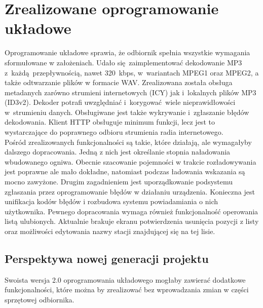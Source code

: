 \documentclass[polish]{aghengthesis}
\begin{document}
	\section{Zrealizowane oprogramowanie układowe}
			Oprogramowanie układowe sprawia, że odbiornik spełnia wszystkie wymagania sformułowane w założeniach.
			Udało się zaimplementować dekodowanie MP3 z~każdą przepływnością, nawet 320~kbps, w~wariantach MPEG1 oraz MPEG2, a także odtwarzanie plików w formacie WAV.
			Zrealizowana została obsługa metadanych zarówno strumieni internetowych (ICY) jak i~lokalnych plików MP3 (ID3v2). Dekoder potrafi uwzględniać i~korygować wiele nieprawidłowości w~strumieniu danych. Obsługiwane jest także wykrywanie i~zgłaszanie błędów dekodowania. Klient HTTP obsługuje minimum funkcji, lecz jest to wystarczające do poprawnego odbioru strumienia radia internetowego.
			$ $\\
			
%			

			Pośród zrealizowanych funkcjonalności są takie, które działają, ale wymagałyby dalszego dopracowania. Jedną z nich jest określanie stopnia naładowania wbudowanego ogniwa. Obecnie szacowanie pojemności w trakcie rozładowywania jest poprawne ale mało dokładne, natomiast podczas ładowania wskazania są mocno zawyżone. 
			Drugim zagadnieniem jest uporządkowanie podsystemu zgłaszania przez oprogramowanie błędów w działaniu urządzenia. Konieczna jest unifikacja kodów błędów i rozbudowa systemu powiadamiania o nich użytkownika.
			Pewnego dopracowania wymaga również funkcjonalność operowania listą ulubionych. Aktualnie brakuje ekranu potwierdzenia usunięcia pozycji z listy oraz możliwości edytowania nazwy stacji znajdującej się na tej lisie.
		
		\subsection{Perspektywa nowej generacji projektu}
			Swoista wersja 2.0 oprogramowania układowego mogłaby zawierać dodatkowe funkcjonalności, które można by zrealizować bez wprowadzania zmian w części sprzętowej odbiornika.
			$ $\\
			
\end{document}
